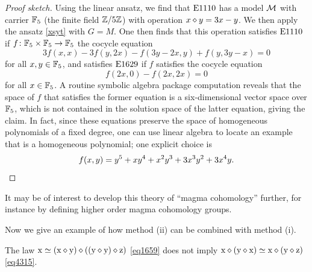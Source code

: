 \begin{proof}[Proof sketch] Using the linear ansatz, we find that $\mathrm{E}1110$ has a model ${\mathcal{M}}$ with carrier $\mathbb{F}_5$ (the finite field $\mathbb{Z}/5\mathbb{Z}$) with operation $x \diamond y = 3x-y$.  We then apply the ansatz \eqref{xsyt} with $G=M$.  One then finds that this operation satisfies $\mathrm{E}1110$ if $f \colon \mathbb{F}_5 \times \mathbb{F}_5 \to \mathbb{F}_5$  the cocycle equation
  $$3f(x,x) - 3f(y,2x) - f(3y-2x,y) + f(y,3y-x) = 0$$
for all $x,y \in \mathbb{F}_5$, and satisfies $\mathrm{E}1629$ if $f$ satisfies the cocycle equation
$$ f(2x,0) - f(2x,2x) = 0$$
for all $x \in \mathbb{F}_5$.  A routine symbolic algebra package computation reveals that the space of $f$ that satisfies the former equation is a six-dimensional vector space over $\mathbb{F}_5$, which is not contained in the solution space of the latter equation, giving the claim.
In fact, since these equations preserve the space of homogeneous polynomials of a fixed degree, one can use linear algebra to locate an example that is a homogeneous polynomial; one explicit choice is
\[
f(x,y) = y^5 +xy^4 + x^2y^3 +3x^3 y^2 + 3x^4 y. \qedhere
\]
\end{proof}

It may be of interest to develop this theory of ``magma cohomology'' further, for instance by defining higher order magma cohomology groups.

Now we give an example of how method (ii) can be combined with method (i).

\begin{proposition}[$\Eq{1659} \nmodels \Eq{4315}$]\label{1659-4315} The law $\mathrm{x} \simeq (\mathrm{x} \diamond \mathrm{y}) \diamond ((\mathrm{y} \diamond \mathrm{y}) \diamond \mathrm{z})$ \eqref{eq1659} does not imply $\mathrm{x} \diamond (\mathrm{y} \diamond \mathrm{x}) \simeq \mathrm{x} \diamond (\mathrm{y} \diamond \mathrm{z})$ \eqref{eq4315}.
\end{proposition}


